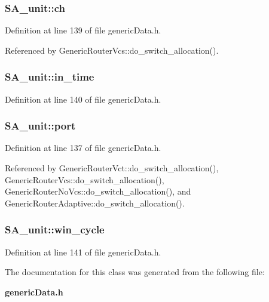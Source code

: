 \subsubsection[{ch}]{ {\bf SA\_\-unit::ch}}\label{classSA__unit_07b14e6d4de745f64d8715563f31a2e5}




Definition at line 139 of file genericData.h.

Referenced by GenericRouterVcs::do\_\-switch\_\-allocation().
\subsubsection[{in\_\-time}]{ {\bf SA\_\-unit::in\_\-time}}\label{classSA__unit_21275ff5bee7a72e60b406846e0b982d}




Definition at line 140 of file genericData.h.
\subsubsection[{port}]{ {\bf SA\_\-unit::port}}\label{classSA__unit_f2bd521c837d03abb97d9c8d0e037c0d}




Definition at line 137 of file genericData.h.

Referenced by GenericRouterVct::do\_\-switch\_\-allocation(), GenericRouterVcs::do\_\-switch\_\-allocation(), GenericRouterNoVcs::do\_\-switch\_\-allocation(), and GenericRouterAdaptive::do\_\-switch\_\-allocation().
\subsubsection[{win\_\-cycle}]{ {\bf SA\_\-unit::win\_\-cycle}}\label{classSA__unit_14b3c42d58942995777aae70ff7defc5}




Definition at line 141 of file genericData.h.

The documentation for this class was generated from the following file:\begin{CompactItemize}
\item 
{\bf genericData.h}\end{CompactItemize}
